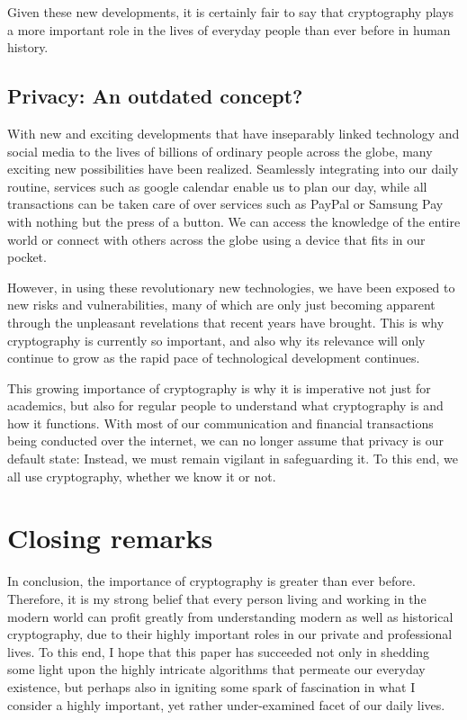 \documentclass[12pt]{report}
\theoremstyle{definition}
\theoremstyle{remark}
\begin{document}
Given these new developments, it is certainly fair to say that cryptography plays a more important role in the lives of everyday people than ever before in human history.

\subsection{Privacy: An outdated concept?}
With new and exciting developments that have inseparably linked technology and social media to the lives of billions of ordinary people across the globe, many exciting new possibilities have been realized. Seamlessly integrating into our daily routine, services such as google calendar enable us to plan our day, while all transactions can be taken care of over services such as PayPal or Samsung Pay with nothing but the press of a button. We can access the knowledge of the entire world or connect with others across the globe using a device that fits in our pocket.

However, in using these revolutionary new technologies, we have been exposed to new risks and vulnerabilities, many of which are only just becoming apparent through the unpleasant revelations that recent years have brought. This is why cryptography is currently so important, and also why its relevance will only continue to grow as the rapid pace of technological development continues.

This growing importance of cryptography is why it is imperative not just for academics, but also for regular people to understand what cryptography is and how it functions. With most of our communication and financial transactions being conducted over the internet, we can no longer assume that privacy is our default state: Instead, we must remain vigilant in safeguarding it. To this end, we all use cryptography, whether we know it or not.

\section{Closing remarks}
In conclusion, the importance of cryptography is greater than ever before. Therefore, it is my strong belief that every person living and working in the modern world can profit greatly from understanding modern as well as historical cryptography, due to their highly important roles in our private and professional lives. To this end, I hope that this paper has succeeded not only in shedding some light upon the highly intricate algorithms that permeate our everyday existence, but perhaps also in igniting some spark of fascination in what I consider a highly important, yet rather under-examined facet of our daily lives.
\end{document}
